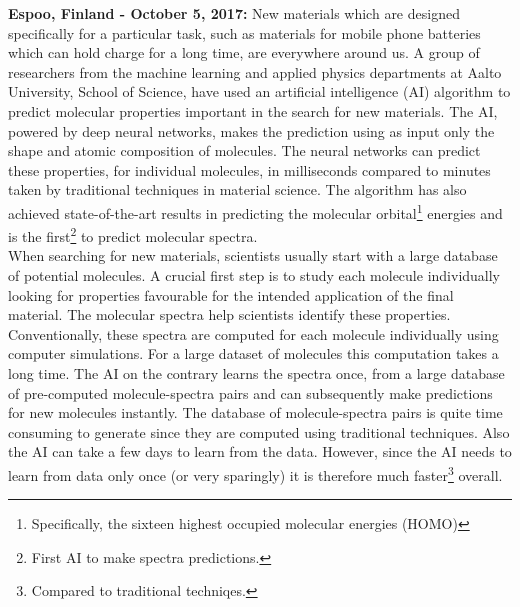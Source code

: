 \documentclass[a4paper]{article}
\title{\justify\fontsize{20}{20}\selectfont{AI developed by a group of researchers at Aalto University could significantly speed up the search for new materials.}}
\begin{document}
\date{}
\maketitle
%     

\noindent \textbf{Espoo, Finland - October 5, 2017:} New materials which are designed specifically for a particular task, such as materials for mobile phone batteries which can hold charge for a long time, are everywhere around us. A group of researchers from the machine learning and applied physics departments at Aalto University, School of Science, have used an artificial intelligence (AI) algorithm to predict molecular properties important in the search for new materials. The AI, powered by deep neural networks, makes the prediction using as input only the shape and atomic composition of molecules. The neural networks can predict these properties, for individual molecules, in milliseconds compared to minutes taken by traditional techniques in material science. The algorithm has also achieved state-of-the-art results in predicting the molecular orbital\footnote{Specifically, the sixteen highest occupied molecular energies (HOMO)} energies and is the first\footnote{First AI to make spectra predictions.} to predict molecular spectra.\\

When searching for new materials, scientists usually start with a large database of potential molecules. A crucial first step is to study each molecule individually looking for properties favourable for the intended application of the final material. The molecular spectra help scientists identify these properties. 
Conventionally, these spectra are computed for each molecule individually using computer simulations. For a large dataset of molecules this computation takes a long time.
The AI on the contrary learns the spectra once, from a large database of pre-computed molecule-spectra pairs and can subsequently make predictions for new molecules instantly.
The database of molecule-spectra pairs is quite time consuming to generate since they are computed using traditional techniques. Also the AI can take a few days to learn from the data. However, since the AI needs to learn from data only once (or very sparingly) it is therefore much faster\footnote{Compared to traditional techniqes.} overall.\\
\end{document}
